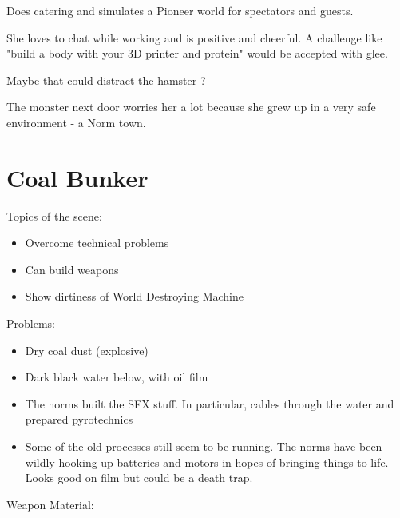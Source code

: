 \begin{npcBox}[title=Cherie]
    \begin{consequences}
    \item {}
    \item {}
    \item {}
    \end{consequences}

    \begin{npcDescription}
    Does catering and simulates a Pioneer world for spectators and guests.

    She loves to chat while working and is positive and cheerful. A challenge like "build a body with your 3D printer and protein" would be accepted with glee.

    Maybe that could distract the hamster ?

    The monster next door worries her a lot because she grew up in a very safe environment - a Norm town.

    \end{npcDescription}

\end{npcBox}



\section{Coal Bunker}

Topics of the scene:
\begin{itemize}
\item Overcome technical problems
\item Can build weapons
\item Show dirtiness of World Destroying Machine
\end{itemize}

Problems:

\begin{itemize}
\item Dry coal dust (explosive)
\item Dark black water below, with oil film
\item The norms built the SFX stuff. In particular, cables through the water and prepared pyrotechnics
\item Some of the old processes still seem to be running. The norms have been wildly hooking up batteries and motors in hopes of bringing things to life. Looks good on film but could be a death trap.
\end{itemize}

Weapon Material:

